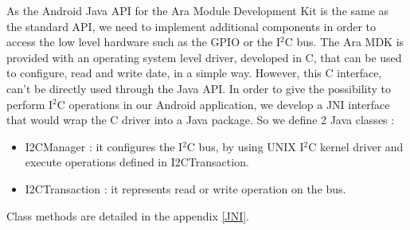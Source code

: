 As the Android Java API for the Ara Module Development Kit is the same as the standard API, we need to implement additional components in order to access the low level hardware such as the GPIO or the I$^2$C bus.
The Ara MDK is provided with an operating system level driver, developed in C, that can be used to configure, read and write date, in a simple way.
However, this C interface, can't be directly used through the Java API. In order to give the possibility to perform I$^2$C operations in our Android application, we develop a JNI interface that would wrap the C driver into a Java package.
So we define 2 Java classes : 
\begin{itemize}
\item I2CManager : it configures the I$^2$C bus, by using UNIX I$^2$C kernel driver and execute operations defined in I2CTransaction.
\item I2CTransaction : it represents read or write operation on the bus.
\end{itemize}

Class methods are detailed in the appendix \ref{JNI}.
